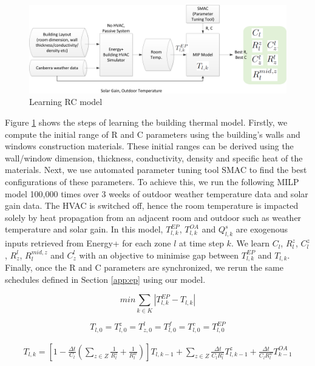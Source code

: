 \begin{figure}[h]
	\centering
		\includegraphics[width=0.9\linewidth,keepaspectratio]{./figs/app_learnrc.png}		
	\caption{Learning RC model}
	\label{fig:rc}
\end{figure}

Figure \ref{fig:rc} shows the steps of learning the building thermal model. Firstly, we compute the initial range of R and C parameters using the building's walls and windows construction materials. These initial ranges can be derived using the wall/window dimension, thickness, conductivity, density and specific heat of the materials. Next, we use automated parameter tuning tool SMAC \citep{hutter2011sequential} to find the best configurations of these parameters. To achieve this, we run the following MILP model 100,000 times over 3 weeks of outdoor weather temperature data and solar gain data. The HVAC is switched off, hence the room temperature is impacted solely by heat propagation from an adjacent room and outdoor such as weather temperature and solar gain. In this model, $T^{EP}_{l,k}$, $T^{OA}_{l,k}$ and $Q^{s}_{l,k}$ are exogenous inputs retrieved from Energy+ for each zone $l$ at time step $k$. We learn ${C_l}$, ${R^z_l}$, ${C_l^z}$, ${R^l_z}$, ${R^{mid,z}_l}$ and ${C_z^l}$ with an objective to minimise gap between $T^{EP}_{l,k}$ and $T_{l,k}$. Finally, once the R and C parameters are synchronized, we rerun the same schedules defined in Section \ref{app:ep} using our model. 

\begin{equation}
min \sum_{k\in K} \left|T^{EP}_{l,k} - T_{l,k}\right|
\end{equation}

\begin{equation}
{T}_{l,0} = T^{z}_{l,0} = T^{l}_{z,0} = T^{f}_{l,0} = T^{c}_{l,0} = T^{EP}_{l,0}
\end{equation}

\begin{equation}\label{eq:app_t}
\begin{split}
{T}_{l,k} = 
\left[ 1 - \frac{\Delta t}{C_l} (\sum_{z\in Z} \frac{1}{{R}^{z}_l} + \frac{1}{{R}^{w}_l})  \right] T_{l,k-1} + 
\sum_{z\in Z} \frac{\Delta t}{{C_l}{R^{z}_l}} T^{z}_{l,k-1} + 
\frac{\Delta t}{{C_l}{R^{w}_l}} T^{OA}_{k-1} 
\end{split}
\end{equation}

